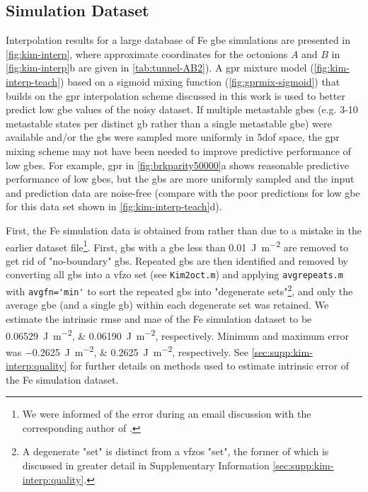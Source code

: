 \documentclass[final,twocolumn,12pt]{elsarticle}
\newcommand{\matlab}[1]{\mbox{\lstinline[style=Matlab-editor]{#1}}}
\newcommand{\inpt}{input}
\newcommand{\outpt}{prediction}
\begin{document}
\subsection{Simulation Dataset}
\label{sec:results:simulation}
Interpolation results for a large database of Fe \gls{gbe} simulations \cite{kimPhasefieldModeling3D2014} are presented in \cref{fig:kim-interp}, where approximate coordinates for the octonions $A$ and $B$ in \cref{fig:kim-interp}b are given in \cref{tab:tunnel-AB2}). A \gls{gpr} mixture model (\cref{fig:kim-interp-teach}) based on a sigmoid mixing function (\cref{fig:gprmix-sigmoid}) that builds on the \gls{gpr} interpolation scheme discussed in this work is used to better predict low \gls{gbe} values of the noisy dataset. If multiple metastable \glspl{gbe} (e.g. 3-10 metastable states per distinct \gls{gb} rather than a single metastable \gls{gbe}) were available and/or the \glspl{gb} were sampled more uniformly in \gls{5dof} space, the \gls{gpr} mixing scheme may not have been needed to improve predictive performance of low \glspl{gbe}. For example, \gls{gpr} in \cref{fig:brkparity50000}a shows reasonable predictive performance of low \glspl{gbe}, but the \glspl{gb} are more uniformly sampled and the \inpt{} and \outpt{} data are noise-free (compare with the poor predictions for low \gls{gbe} for this data set shown in \cref{fig:kim-interp-teach}d).

First, the Fe simulation data is obtained from \cite{kimPhasefieldModeling3D2014} rather than \cite{kimIdentificationSchemeGrain2011} due to a mistake in the earlier dataset file\footnote{We were informed of the error during an email discussion with the corresponding author of \cite{kimPhasefieldModeling3D2014}.}. First, \glspl{gb} with a \gls{gbe} less than \SI{0.01}{\joule\per\square\meter} are removed to get rid of "no-boundary" \glspl{gb}. Repeated \glspl{gb} are then identified and removed by converting all \glspl{gb} into a \gls{vfzo} set (see \matlab{Kim2oct.m}) and applying \matlab{avgrepeats.m} with \matlab{avgfn='min'} to sort the repeated \glspl{gb} into "degenerate sets"\footnote{A degenerate "set" is distinct from a \glspl{vfzo} "set", the former of which is discussed in greater detail in Supplementary Information \cref{sec:supp:kim-interp:quality}. }, and only the average \gls{gbe} (and a single \gls{gb}) within each degenerate set was retained. We estimate the intrinsic \gls{rmse} and \gls{mae} of the Fe simulation dataset to be \SIlist{0.06529;0.06190}{\joule\per\square\meter}, respectively. Minimum and maximum error was \SIlist{-0.2625;0.2625}{\joule\per\square\meter}, respectively. See \cref{sec:supp:kim-interp:quality} for further details on methods used to estimate intrinsic error of the Fe simulation dataset.
\end{document}
